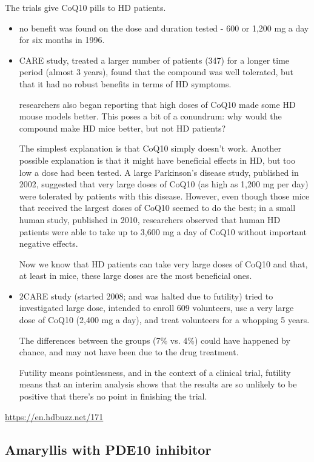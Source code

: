 The trials give CoQ10 pills to HD patients.
\begin{itemize}
  \item no benefit was found on the dose and duration tested - 600 or 1,200 mg a
  day for six months in 1996.
  
  \item CARE study, treated a larger number of patients (347) for a longer time
  period (almost 3 years), found that the compound was well tolerated, but that
  it had no robust benefits in terms of HD symptoms.
  
  researchers also began reporting that high doses of CoQ10 made some HD mouse
  models better. This poses a bit of a conundrum: why would the compound make HD
  mice better, but not HD patients? 
  
  The simplest explanation is that CoQ10 simply doesn't work. Another possible
  explanation is that it might have beneficial effects in HD, but too low a dose
  had been tested. A large Parkinson's disease study, published in 2002,
  suggested that very large doses of CoQ10 (as high as 1,200 mg per day) were
  tolerated by patients with this disease. However, even though those mice that
  received the largest doses of CoQ10 seemed to do the best; in a small human
  study, published in 2010, researchers observed that human HD patients were
  able to take up to 3,600 mg a day of CoQ10 without important negative effects.

 Now we know that HD patients can take very large doses of CoQ10 and that, at
 least in mice, these large doses are the most beneficial ones.
 
 \item 2CARE study (started 2008; and was halted due to futility) tried to
 investigated large dose, intended to enroll 609 volunteers, use a very large
 dose of CoQ10 (2,400 mg a day), and treat volunteers for a whopping 5 years.

The differences between the groups (7\% vs. 4\%) could have happened by chance,
and may not have been due to the drug treatment.

Futility means pointlessness, and in the context of a clinical trial, futility
means that an interim analysis shows that the results are so unlikely to be
positive that there's no point in finishing the trial.

  
\end{itemize}
\url{https://en.hdbuzz.net/171}

\subsection{Amaryllis with PDE10 inhibitor}


